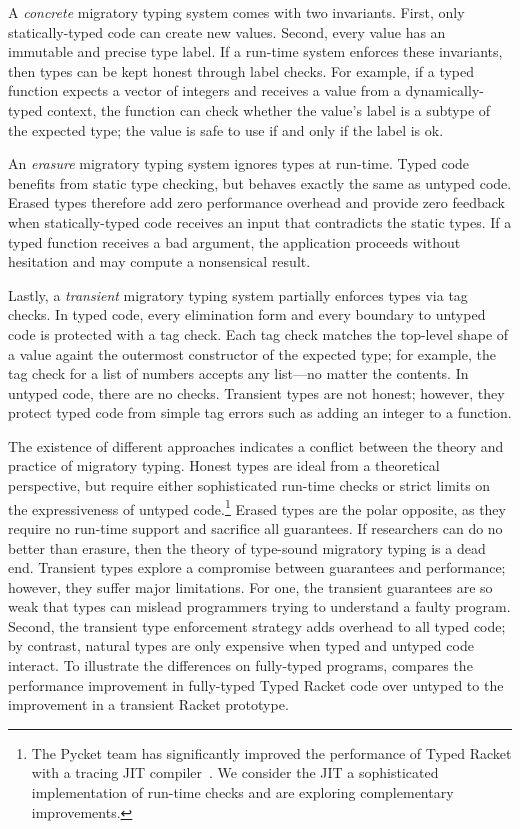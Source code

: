 A \emph{concrete}\/ migratory typing system comes with two invariants.
First, only statically-typed code can create new values.
Second, every value has an immutable and precise type label.
If a run-time system enforces these invariants, then types can be kept honest
 through label checks.
For example, if a typed function expects a vector of integers and receives
 a value from a dynamically-typed context, the function can check whether the
 value's label is a subtype of the expected type;
 the value is safe to use if and only if the label is ok.

An \emph{erasure}\/ migratory typing system ignores types at run-time.
Typed code benefits from static type checking, but behaves exactly the same
 as untyped code.
Erased types therefore add zero performance overhead and provide zero feedback
 when statically-typed code receives an input that contradicts the static
 types.
If a typed function receives a bad argument, the application proceeds without
 hesitation and may compute a nonsensical result.

Lastly, a \emph{transient}\/ migratory typing system partially enforces types
 via tag checks.
In typed code, every elimination form and every boundary to untyped code
 is protected with a tag check.
Each tag check matches the top-level shape of a value againt the outermost
 constructor of the expected type; for example, the tag check for a
 list of numbers accepts any list---no matter the contents.
In untyped code, there are no checks.
Transient types are not honest; however, they protect typed code from simple
 tag errors such as adding an integer to a function.

The existence of different approaches indicates a conflict between the theory
 and practice of migratory typing.
Honest types are ideal from a theoretical perspective, but require either
 sophisticated run-time checks or strict limits on the expressiveness of
 untyped code.\footnote{The Pycket team has significantly improved the performance
  of Typed Racket with a tracing JIT compiler~\cite{bbst-oopsla-2017}.
  We consider the JIT a sophisticated implementation of run-time checks
  and are exploring complementary improvements.}
Erased types are the polar opposite, as they require no run-time support
 and sacrifice all guarantees.
If researchers can do no better than erasure, then the theory of
 type-sound migratory typing is a dead end.
Transient types explore a compromise between guarantees and performance;
 however, they suffer major limitations.
For one, the transient guarantees are so weak that types can mislead
 programmers trying to understand a faulty program.
Second, the transient type enforcement strategy adds overhead to all typed code;
 by contrast, natural types are only expensive when typed and untyped code interact.
To illustrate the differences on fully-typed programs,
  compares the performance improvement
 in fully-typed Typed Racket code over untyped to the improvement in a
 transient Racket prototype.

